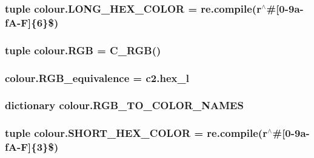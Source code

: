 \subsubsection[{L\+O\+N\+G\+\_\+\+H\+E\+X\+\_\+\+C\+O\+L\+O\+R}]{\setlength{\rightskip}{0pt plus 5cm}tuple colour.\+L\+O\+N\+G\+\_\+\+H\+E\+X\+\_\+\+C\+O\+L\+O\+R = re.\+compile(r\textquotesingle{}$^\wedge$\#\mbox{[}0-\/9a-\/f\+A-\/\+F\mbox{]}\{6\}\$\textquotesingle{})}\label{namespacecolour_ae4a86e3c28f0ebb79e51c566a1158fe3}
\hypertarget{namespacecolour_a0e3297b74ebafaa89d8af0d18f547afe}{}
\subsubsection[{R\+G\+B}]{\setlength{\rightskip}{0pt plus 5cm}tuple colour.\+R\+G\+B = {\bf C\+\_\+\+R\+G\+B}()}\label{namespacecolour_a0e3297b74ebafaa89d8af0d18f547afe}
\hypertarget{namespacecolour_a875f4229391153785064cb3c99096339}{}
\subsubsection[{R\+G\+B\+\_\+equivalence}]{\setlength{\rightskip}{0pt plus 5cm}colour.\+R\+G\+B\+\_\+equivalence = c2.\+hex\+\_\+l}\label{namespacecolour_a875f4229391153785064cb3c99096339}
\hypertarget{namespacecolour_af7d83e368add5ddec7fda18fc150f958}{}
\subsubsection[{R\+G\+B\+\_\+\+T\+O\+\_\+\+C\+O\+L\+O\+R\+\_\+\+N\+A\+M\+E\+S}]{\setlength{\rightskip}{0pt plus 5cm}dictionary colour.\+R\+G\+B\+\_\+\+T\+O\+\_\+\+C\+O\+L\+O\+R\+\_\+\+N\+A\+M\+E\+S}\label{namespacecolour_af7d83e368add5ddec7fda18fc150f958}
\hypertarget{namespacecolour_a82379003713538cfd6135bb378d1efd8}{}
\subsubsection[{S\+H\+O\+R\+T\+\_\+\+H\+E\+X\+\_\+\+C\+O\+L\+O\+R}]{\setlength{\rightskip}{0pt plus 5cm}tuple colour.\+S\+H\+O\+R\+T\+\_\+\+H\+E\+X\+\_\+\+C\+O\+L\+O\+R = re.\+compile(r\textquotesingle{}$^\wedge$\#\mbox{[}0-\/9a-\/f\+A-\/\+F\mbox{]}\{3\}\$\textquotesingle{})}\label{namespacecolour_a82379003713538cfd6135bb378d1efd8}
